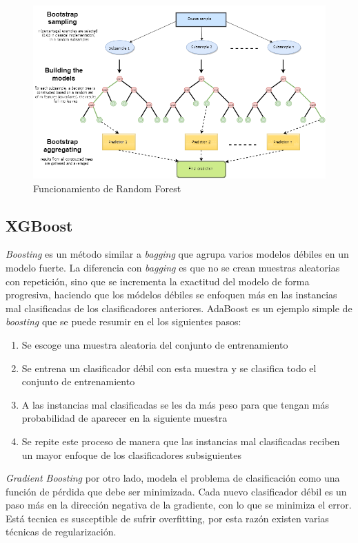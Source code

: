 \begin{figure}[htbp]
	\centering
	\includegraphics[width=\linewidth]{graficos/rf.png}
	\caption{Funcionamiento de Random Forest \citep{mql5:rf}}
	\label{fig:rf}
\end{figure}


\subsection{XGBoost}

\textit{Boosting} es un método similar a \textit{bagging} que agrupa varios modelos débiles en un modelo fuerte. La diferencia con \textit{bagging} es que no se crean muestras aleatorias con repetición, sino que se incrementa la exactitud del modelo de forma progresiva, haciendo que los módelos débiles se enfoquen más en las instancias mal clasificadas de los clasificadores anteriores. AdaBoost es un ejemplo simple de \textit{boosting} que se puede resumir en el los siguientes pasos:

\begin{enumerate}
	\item Se escoge una muestra aleatoria del conjunto de entrenamiento
	\item Se entrena un clasificador débil con esta muestra y se clasifica todo el conjunto de entrenamiento
	\item A las instancias mal clasificadas se les da más peso para que tengan más probabilidad de aparecer en la siguiente muestra
	\item Se repite este proceso de manera que las instancias mal clasificadas reciben un mayor enfoque de los clasificadores subsiguientes
\end{enumerate}

\textit{Gradient Boosting} por otro lado, modela el problema de clasificación como una función de pérdida que debe ser minimizada. Cada nuevo clasificador débil es un paso más en la dirección negativa de la gradiente, con lo que se minimiza el error. Está tecnica es susceptible de sufrir overfitting, por esta razón existen varias técnicas de regularización.

